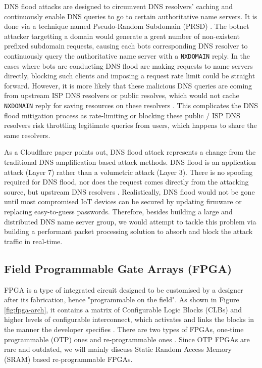 \documentclass[a4paper]{report}
\newcommand{\code}{\texttt}
\begin{document}
DNS flood attacks are designed to circumvent DNS resolvers' caching and continuously enable DNS queries to go to certain authoritative name servers. It is done via a technique named Pseudo-Random Subdomain (PRSD) \cite{akamai-dns-flood}. The botnet attacker targetting a domain would generate a great number of non-existent prefixed subdomain requests, causing each bots corresponding DNS resolver to continuously query the authoritative name server with a \code{NXDOMAIN} reply. In the cases where bots are conducting DNS flood are making requests to name servers directly, blocking such clients and imposing a request rate limit could be straight forward. However, it is more likely that these malicious DNS queries are coming from upstream ISP DNS resolvers or public resolves, which would not cache \code{NXDOMAIN} reply for saving resources on these resolvers \cite{akamai-dns-flood}. This complicates the DNS flood mitigation process as rate-limiting or blocking these public / ISP DNS resolvers risk throttling legitimate queries from users, which happens to share the same resolvers.

As a Cloudflare paper \cite{cloudflare-dns-flood} points out, DNS flood attack represents a change from the traditional DNS amplification based attack methods. DNS flood is an application attack (Layer 7) rather than a volumetric attack (Layer 3). There is no spoofing required for DNS flood, nor does the request comes directly from the attacking source, but upstream DNS resolvers \cite{akamai-dns-flood, cloudflare-dns-flood}. Realistically, DNS flood would not be gone until most compromised IoT devices can be secured by updating firmware or replacing easy-to-guess passwords. Therefore, besides building a large and distributed DNS name server group, we would attempt to tackle this problem via building a performant packet processing solution to absorb and block the attack traffic in real-time.

\subsection{Field Programmable Gate Arrays (FPGA)}
\label{section:background-fpga}

FPGA is a type of integrated circuit designed to be customised by a designer after its fabrication, hence "programmable on the field". As shown in Figure \ref{fig:fpga-arch}, it contains a matrix of Configurable Logic Blocks (CLBs) and higher levels of configurable interconnect, which activates and links the blocks in the manner the developer specifies \cite{xilinx-fpga}. There are two types of FPGAs, one-time programmable (OTP) ones and re-programmable ones \cite{xilinx-fpga}. Since OTP FPGAs are rare and outdated, we will mainly discuss Static Random Access Memory (SRAM) based re-programmable FPGAs.
\end{document}
